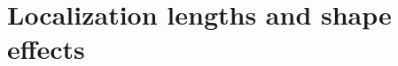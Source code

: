 \documentclass[english, twocolumn, 10pt, aps, superscriptaddress, floatfix, prb, citeautoscript]{revtex4-1}
\renewcommand{\comment}[2]{#2}
\renewcommand{\comment}{\paragraph}
\begin{document}







\section{Localization lengths and shape effects}\label{sec:shape_effects}
\end{document}
